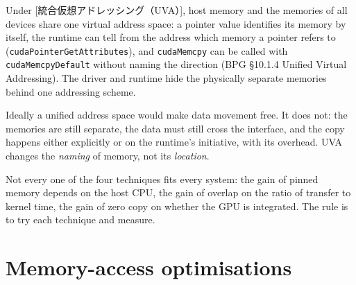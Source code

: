 \documentclass[../main.tex]{subfiles}
\begin{document}
\begin{definition}
  Under
  [統合仮想アドレッシング（UVA）],
  host memory and the memories of all devices share one virtual
  address space: a pointer value identifies its memory by itself, the
  runtime can tell from the address which memory a pointer refers to
  (\texttt{cudaPointerGetAttributes}), and
  \texttt{cudaMemcpy} can be called with \texttt{cudaMemcpyDefault}
  without naming the direction (BPG §10.1.4 Unified Virtual
  Addressing).  The driver and runtime hide the physically separate
  memories behind one addressing scheme.
\end{definition}

Ideally a unified address space would make data movement free.  It does
not: the memories are still separate, the data must still cross the
interface, and the copy happens either explicitly or on the runtime's
initiative, with its overhead.  UVA changes the \emph{naming} of memory,
not its \emph{location}.

Not every one of the four techniques fits every system: the gain of
pinned memory depends on the host CPU, the gain of overlap on the ratio
of transfer to kernel time, the gain of zero copy on whether the GPU is
integrated.  The rule is to try each technique and measure.

\section{Memory-access optimisations}
\label{sec:l05-memory}
\end{document}
